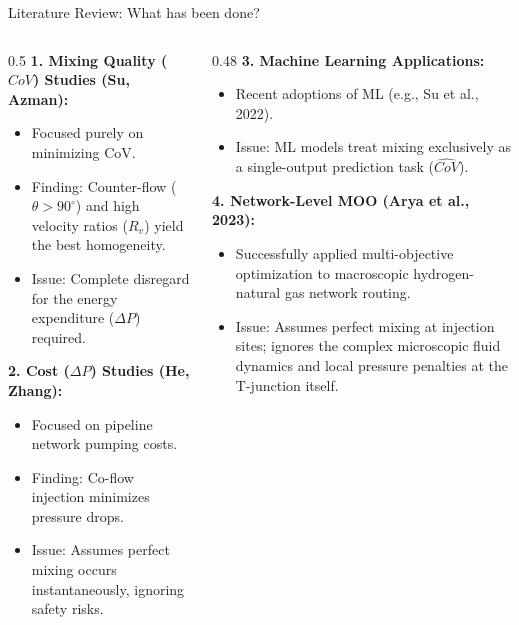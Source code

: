 \documentclass[10pt, aspectratio=169]{beamer}
\begin{document}
\begin{frame}{Literature Review: What has been done?}
    \begin{columns}[T]
        \begin{column}{0.5\textwidth}
            \textbf{1. Mixing Quality ($CoV$) Studies (Su, Azman):}
            \begin{itemize}
                \small
                \item Focused purely on minimizing CoV.
                \item Finding: Counter-flow ($\theta > 90^\circ$) and high velocity ratios ($R_v$) yield the best homogeneity.
                \item \alert{Issue:} Complete disregard for the energy expenditure ($\Delta P$) required.
            \end{itemize}

            \vspace{0.4em}
            \textbf{2. Cost ($\Delta P$) Studies (He, Zhang):}
            \begin{itemize}
                \small
                \item Focused on pipeline network pumping costs.
                \item Finding: Co-flow injection minimizes pressure drops.
                \item \alert{Issue:} Assumes perfect mixing occurs instantaneously, ignoring safety risks.
            \end{itemize}
        \end{column}
        \begin{column}{0.48\textwidth}
            \textbf{3. Machine Learning Applications:}
            \begin{itemize}
                \small
                \item Recent adoptions of ML (e.g., Su et al., 2022).
                \item \alert{Issue:} ML models treat mixing exclusively as a single-output prediction task ($\widehat{CoV}$).
            \end{itemize}

            \vspace{0.8em}
            \textbf{4. Network-Level MOO (Arya et al., 2023):}
            \begin{itemize}
                \small
                \item Successfully applied multi-objective optimization to macroscopic hydrogen-natural gas network routing.
                \item \alert{Issue:} Assumes perfect mixing at injection sites; ignores the complex microscopic fluid dynamics and local pressure penalties at the T-junction itself.
            \end{itemize}
        \end{column}
    \end{columns}
\end{frame}
\end{document}
